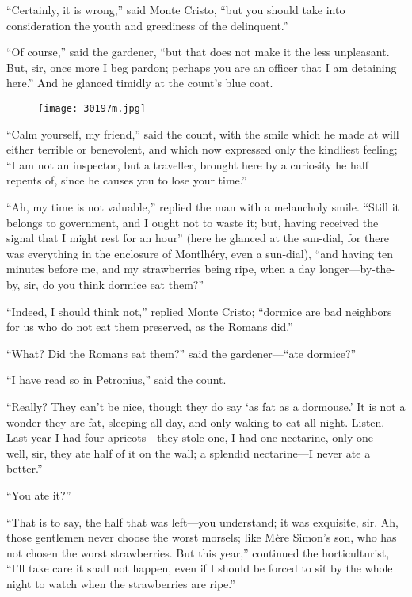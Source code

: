 “Certainly, it is wrong,” said Monte Cristo, “but you should take into
consideration the youth and greediness of the delinquent.”

“Of course,” said the gardener, “but that does not make it the less
unpleasant. But, sir, once more I beg pardon; perhaps you are an
officer that I am detaining here.” And he glanced timidly at the
count’s blue coat.

\begin{figure}[ht]
\texttt{[image: 30197m.jpg]}
\end{figure}

“Calm yourself, my friend,” said the count, with the smile which he
made at will either terrible or benevolent, and which now expressed
only the kindliest feeling; “I am not an inspector, but a traveller,
brought here by a curiosity he half repents of, since he causes you to
lose your time.”

“Ah, my time is not valuable,” replied the man with a melancholy smile.
“Still it belongs to government, and I ought not to waste it; but,
having received the signal that I might rest for an hour” (here he
glanced at the sun-dial, for there was everything in the enclosure of
Montlhéry, even a sun-dial), “and having ten minutes before me, and my
strawberries being ripe, when a day longer—by-the-by, sir, do you think
dormice eat them?”

“Indeed, I should think not,” replied Monte Cristo; “dormice are bad
neighbors for us who do not eat them preserved, as the Romans did.”

“What? Did the Romans eat them?” said the gardener—“ate dormice?”

“I have read so in Petronius,” said the count.

“Really? They can’t be nice, though they do say ‘as fat as a dormouse.’
It is not a wonder they are fat, sleeping all day, and only waking to
eat all night. Listen. Last year I had four apricots—they stole one, I
had one nectarine, only one—well, sir, they ate half of it on the wall;
a splendid nectarine—I never ate a better.”

“You ate it?”

“That is to say, the half that was left—you understand; it was
exquisite, sir. Ah, those gentlemen never choose the worst morsels;
like Mère Simon’s son, who has not chosen the worst strawberries. But
this year,” continued the horticulturist, “I’ll take care it shall not
happen, even if I should be forced to sit by the whole night to watch
when the strawberries are ripe.”

